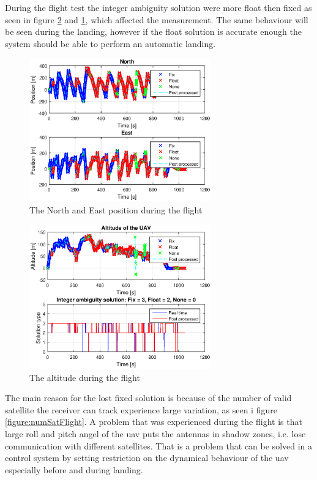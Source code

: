During the flight test the integer ambiguity solution were more float then fixed as seen in figure \ref{figure:DownFlight} and \ref{figure:NorthEastFlight}, which affected the measurement. The same behaviour will be seen during the landing, however if the float solution is accurate enough the system should be able to perform an automatic landing.
\begin{figure}[H]
	\centering
		\includegraphics[width=0.7\textwidth]{figs/plots/northEastFlight.eps}
		\caption{The North and East position during the flight}
		\label{figure:NorthEastFlight}
\end{figure}
\begin{figure}[H]
	\centering
		\includegraphics[width=0.7\textwidth]{figs/plots/AltitudeFlight.eps}
		\caption{The altitude during the flight}
		\label{figure:DownFlight}
\end{figure}
The main reason for the lost fixed solution is because of the number of valid satellite the receiver can track experience large variation, as seen i figure \ref{figure:numSatFlight}. A problem that was experienced during the flight is that large roll and pitch angel of the \gls{uav} puts the antennas in shadow zones, i.e. lose communication with different satellites. That is a problem that can be solved in a control system by setting restriction on the dynamical behaviour of the \gls{uav} especially before and during landing.

